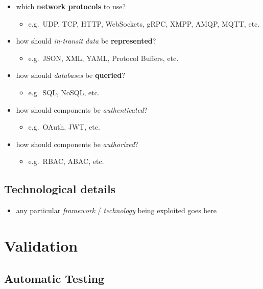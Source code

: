 \documentclass{scrartcl}
\begin{document}
\begin{itemize}
  \item which \textbf{network protocols} to use?
  \begin{itemize}
    \item e.g.~UDP, TCP, HTTP, WebSockets, gRPC, XMPP, AMQP, MQTT, etc.
  \end{itemize}
  
  \item how should \emph{in-transit data} be \textbf{represented}?
  \begin{itemize}
    \item e.g.~JSON, XML, YAML, Protocol Buffers, etc.
  \end{itemize}
  
  \item how should \emph{databases} be \textbf{queried}?
  \begin{itemize}
    \item e.g.~SQL, NoSQL, etc.
  \end{itemize}
  
  \item how should components be \emph{authenticated}?
  \begin{itemize}
    \item e.g.~OAuth, JWT, etc.
  \end{itemize}

  \item how should components be \emph{authorized}?
  \begin{itemize}
    \item e.g.~RBAC, ABAC, etc.
  \end{itemize}
\end{itemize}

\subsection{Technological details}\label{technological-details}

\begin{itemize}
  \item any particular \emph{framework} / \emph{technology} being exploited goes here
\end{itemize}

\section{Validation}\label{validation}

\subsection{Automatic Testing}\label{automatic-testing}
\end{document}
